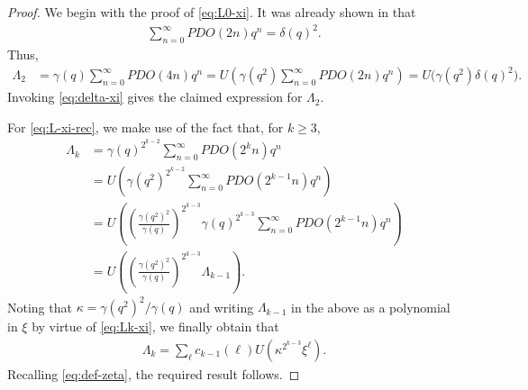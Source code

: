 \documentclass[12pt,reqno]{amsart}
\numberwithin{equation}{section}
\theoremstyle{theorem}
\theoremstyle{definition}
\begin{document}
\begin{proof}
	We begin with the proof of \eqref{eq:L0-xi}. It was already shown in \cite[Theorem 21]{ALL} that
        \begin{align*}
		\sum_{n=0}^\infty PDO(2n)q^n = \delta(q)^2.
	\end{align*}
	Thus,
	\begin{align*}
		\Lambda_2&=\gamma(q)\sum_{n=0}^\infty PDO(4n)q^n = U\left(\gamma(q^2)\sum_{n=0}^\infty PDO(2n)q^n\right) = U\big(\gamma(q^2)\delta(q)^2\big).
	\end{align*}
	Invoking \eqref{eq:delta-xi} gives the claimed expression for $\Lambda_2$.

    For \eqref{eq:L-xi-rec}, we make use of the fact that, for $k\ge 3$,
	\begin{align*}
		\Lambda_k &= \gamma(q)^{2^{k-2}}\sum_{n=0}^\infty PDO(2^{k} n)q^n\\
		&= U\left(\gamma(q^2)^{2^{k-2}}\sum_{n=0}^\infty PDO(2^{k-1} n)q^n\right)\\
		&= U\left(\left(\frac{\gamma(q^2)^{2}}{\gamma(q)}\right)^{2^{k-3}} \gamma(q)^{2^{k-3}}\sum_{n=0}^\infty PDO(2^{k-1} n)q^n\right)\\
		&= U\left(\left(\frac{\gamma(q^2)^{2}}{\gamma(q)}\right)^{2^{k-3}} \Lambda_{k-1}\right).
	\end{align*}
	Noting that $\kappa = \gamma(q^2)^{2}/\gamma(q)$ and writing $\Lambda_{k-1}$ in the above as a polynomial in $\xi$ by virtue of \eqref{eq:Lk-xi}, we finally obtain that
	\begin{align*}
		\Lambda_k = \sum_{\ell} c_{k-1}(\ell) U\left(\kappa^{2^{k-3}}\xi^\ell\right).
	\end{align*}
	Recalling \eqref{eq:def-zeta}, the required result follows.
\end{proof}
\end{document}
